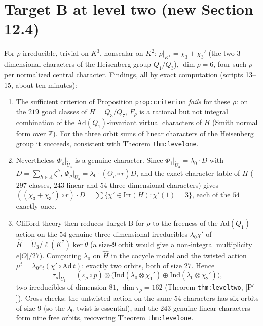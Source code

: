 \documentclass[11pt]{article}
\newcommand{\Z}{\mathbb Z}
\begin{document}
\section*{Target B at level two (new Section 12.4)}
For $\rho$ irreducible, trivial on $K^3$, nonscalar on $K^2$:
$\rho|_{K^1}=\chi_3+\chi_3'$ (the two $3$-dimensional characters of the
Heisenberg group $Q_1/Q_3$), $\dim\rho=6$, four such $\rho$ per
normalized central character.  Findings, all by exact computation
(scripts 13--15, about ten minutes):
\begin{enumerate}[leftmargin=*]
\item The sufficient criterion of Proposition \texttt{prop:criterion}
\emph{fails} for these $\rho$: on the $219$ good classes of $H=Q_3/Q_7$,
$F_\rho$ is a rational but not integral combination of the
$\mathrm{Ad}(Q_1)$-invariant virtual characters of $H$ (Smith normal
form over $\Z$).  For the three orbit sums of linear characters of the
Heisenberg group it succeeds, consistent with Theorem \texttt{thm:levelone}.
\item Nevertheless $\Phi_\rho|_{\tilde U_3}$ is a genuine character.
Since $\Phi_1|_{\tilde U_3}=\lambda_0\cdot D$ with $D=\sum_{h\in\Lambda}\zeta^h$,
$\Phi_\rho|_{\tilde U_3}=\lambda_0\cdot(\Theta_\rho\circ r)D$, and the
exact character table of $H$ ($297$ classes, $243$ linear and $54$
three-dimensional characters) gives
$((\chi_3+\chi_3')\circ r)\cdot D=\sum\{\chi'\in\mathrm{Irr}(H):\chi'(1)=3\}$,
each of the $54$ exactly once.
\item Clifford theory then reduces Target B for $\rho$ to the freeness of
the $\mathrm{Ad}(Q_1)$-action on the $54$ genuine three-dimensional
irreducibles $\lambda_0\chi'$ of $\hat H=\tilde U_3/\ell(K^7)\ker\tilde\theta$
(a size-$9$ orbit would give a non-integral multiplicity $e|O|/27$).
Computing $\lambda_0$ on $\hat H$ in the cocycle model and the twisted
action $\mu^t=\lambda_0 c_t(\chi'\circ\mathrm{Ad}\,t)$: exactly two
orbits, both of size $27$.  Hence
\[
 \tau_\rho|_{\tilde U_1}=(\varepsilon_\rho\circ p)\otimes\bigl(\mathrm{Ind}(\lambda_0\otimes\chi_1')\oplus\mathrm{Ind}(\lambda_0\otimes\chi_2')\bigr),
\]
two irreducibles of dimension $81$, $\dim\tau_\rho=162$ (Theorem
\texttt{thm:leveltwo}, [P$^c$]).  Cross-checks: the untwisted action on
the same $54$ characters has six orbits of size $9$ (so the
$\lambda_0$-twist is essential), and the $243$ genuine linear characters
form nine free orbits, recovering Theorem \texttt{thm:levelone}.
\end{enumerate}
\end{document}
